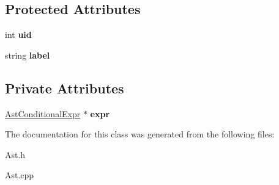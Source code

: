 \subsection*{Protected Attributes}
\begin{DoxyCompactItemize}
\item 
\hypertarget{classAST_a847b778f1c3dd5a19de32de432ee6e15}{int {\bfseries uid}}\label{classAST_a847b778f1c3dd5a19de32de432ee6e15}

\item 
\hypertarget{classAST_ab2e239ccc0688d2341724432ff5a1a31}{string {\bfseries label}}\label{classAST_ab2e239ccc0688d2341724432ff5a1a31}

\end{DoxyCompactItemize}
\subsection*{Private Attributes}
\begin{DoxyCompactItemize}
\item 
\hypertarget{classAstConstantExpr_a2878499ed2328b3952179af5695eeda0}{\hyperlink{classAstConditionalExpr}{Ast\-Conditional\-Expr} $\ast$ {\bfseries expr}}\label{classAstConstantExpr_a2878499ed2328b3952179af5695eeda0}

\end{DoxyCompactItemize}


The documentation for this class was generated from the following files\-:\begin{DoxyCompactItemize}
\item 
Ast.\-h\item 
Ast.\-cpp\end{DoxyCompactItemize}
